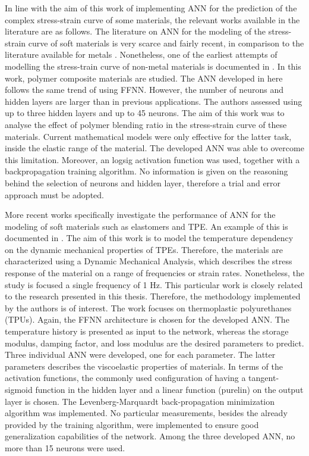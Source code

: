 In line with the aim of this work of implementing ANN for the prediction of the complex stress-strain curve of some materials, the relevant works available in the literature are as follows. The literature on ANN for the modeling of the stress-strain curve of soft materials is very scarce and fairly recent, in comparison to the literature available for metals \cite{ altinkok2005use,setti2014artificial, jenik2017sequential}. Nonetheless, one of the earliest attempts of modelling the stress-train curve of non-metal materials is documented in \cite{yousef2011prediction}. In this work, polymer composite materials are studied. The ANN developed in here follows the same trend of using FFNN. However, the number of neurons and hidden layers are larger than in previous applications. The authors assessed using up to three hidden layers and up to 45 neurons. The aim of this work was to analyse the effect of polymer blending ratio in the stress-strain curve of these materials. Current mathematical models were only effective for the latter task, inside the elastic range of the material. The developed ANN was able to overcome this limitation. Moreover, an logsig activation function was used, together with a backpropagation training algorithm. No information is given on the reasoning behind the selection of neurons and hidden layer, therefore a trial and error approach must be adopted. 

More recent works specifically investigate the performance of ANN for the modeling of soft materials such as elastomers and TPE. An example of this is documented in \cite{kopal2017modeling}. The aim of this work is to model the temperature dependency on the dynamic mechanical properties of TPEs. Therefore, the materials are characterized using a Dynamic Mechanical Analysis, which describes the stress response of the material on a range of frequencies or strain rates. Nonetheless, the study is focused a single frequency of 1 Hz. This particular work is closely related to the research presented in this thesis. Therefore, the methodology implemented by the authors is of interest. The work focuses on thermoplastic polyurethanes (TPUs). Again, the FFNN architecture is chosen for the developed ANN. The temperature history is presented as input to the network, whereas the storage modulus, damping factor, and loss modulus are the desired parameters to predict. Three individual ANN were developed, one for each parameter. The latter parameters describes the viscoelastic properties of materials. In terms of the activation functions, the commonly used configuration of having a tangent-sigmoid function in the hidden layer and a linear function (purelin) on the output layer is chosen. The Levenberg-Marquardt back-propagation minimization algorithm was implemented. No particular measurements, besides the already provided by the training algorithm, were implemented to ensure good generalization capabilities of the network. Among the three developed ANN, no more than 15 neurons were used.


